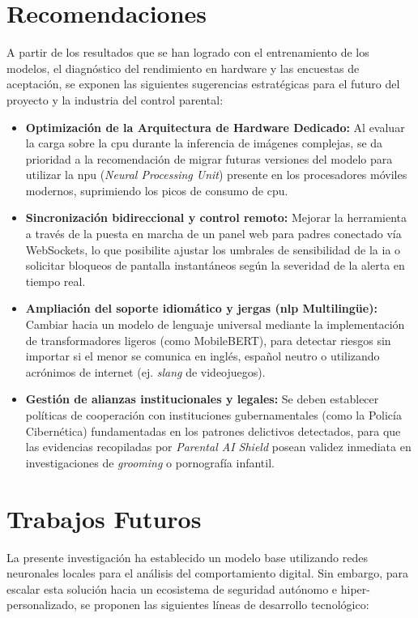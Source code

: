 \section{Recomendaciones}
A partir de los resultados que se han logrado con el entrenamiento de los modelos, el diagnóstico del rendimiento en hardware y las encuestas de aceptación, se exponen las siguientes sugerencias estratégicas para el futuro del proyecto y la industria del control parental:
\begin{itemize}
    \item \textbf{Optimización de la Arquitectura de Hardware Dedicado:} Al evaluar la carga sobre la \gls{cpu} durante la inferencia de imágenes complejas, se da prioridad a la recomendación de migrar futuras versiones del modelo para utilizar la \gls{npu} (\textit{Neural Processing Unit}) presente en los procesadores móviles modernos, suprimiendo los picos de consumo de \gls{cpu}.
    \item \textbf{Sincronización bidireccional y control remoto:} Mejorar la herramienta a través de la puesta en marcha de un panel web para padres conectado vía WebSockets, lo que posibilite ajustar los umbrales de sensibilidad de la \gls{ia} o solicitar bloqueos de pantalla instantáneos según la severidad de la alerta en tiempo real.
    \item \textbf{Ampliación del soporte idiomático y jergas (\gls{nlp} Multilingüe):} Cambiar hacia un modelo de lenguaje universal mediante la implementación de transformadores ligeros (como MobileBERT), para detectar riesgos sin importar si el menor se comunica en inglés, español neutro o utilizando acrónimos de internet (ej. \textit{slang} de videojuegos).
    \item \textbf{Gestión de alianzas institucionales y legales:} Se deben establecer políticas de cooperación con instituciones gubernamentales (como la Policía Cibernética) fundamentadas en los patrones delictivos detectados, para que las evidencias recopiladas por \textit{Parental AI Shield} posean validez inmediata en investigaciones de \textit{grooming} o pornografía infantil.
\end{itemize}

\section{Trabajos Futuros}
La presente investigación ha establecido un modelo base utilizando redes neuronales locales para el análisis del comportamiento digital. Sin embargo, para escalar esta solución hacia un ecosistema de seguridad autónomo e hiper-personalizado, se proponen las siguientes líneas de desarrollo tecnológico: \\


